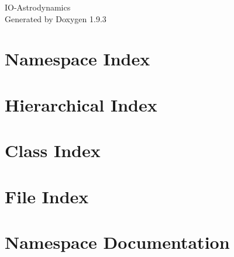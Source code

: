 \documentclass[twoside]{book}
\newcommand{\+}{\discretionary{\mbox{\scriptsize$\hookleftarrow$}}{}{}}
\newcommand{\clearemptydoublepage}{%
    \newpage{\pagestyle{empty}\cleardoublepage}%
  }
\begin{document}
  \raggedbottom
    \hypersetup{pageanchor=false,
                bookmarksnumbered=true,
                pdfencoding=unicode
               }
  \begin{titlepage}
  \vspace*{7cm}
  \begin{center}%
  {\Large IO-\/\+Astrodynamics}\\
  \vspace*{1cm}
  {\large Generated by Doxygen 1.9.3}\\
  \end{center}
  \end{titlepage}
  \clearemptydoublepage
  \tableofcontents
  \clearemptydoublepage
  \hypersetup{pageanchor=true}
\chapter{Namespace Index}

\chapter{Hierarchical Index}

\chapter{Class Index}

\chapter{File Index}

\chapter{Namespace Documentation}



























\end{document}
